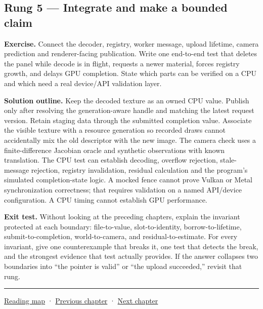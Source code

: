 \subsection{Rung 5 --- Integrate and make a bounded claim}\label{02-foundations-ii-ch038-rung-5-integrate-and-make-a-bounded-claim}

\textbf{Exercise.} Connect the decoder, registry, worker message, upload lifetime, camera prediction and renderer-facing publication. Write one end-to-end test that deletes the panel while decode is in flight, requests a newer material, forces registry growth, and delays GPU completion. State which parts can be verified on a CPU and which need a real device/API validation layer.

\textbf{Solution outline.} Keep the decoded texture as an owned CPU value. Publish only after resolving the generation-aware handle and matching the latest request version. Retain staging data through the submitted completion value. Associate the visible texture with a resource generation so recorded draws cannot accidentally mix the old descriptor with the new image. The camera check uses a finite-difference Jacobian oracle and synthetic observations with known translation. The CPU test can establish decoding, overflow rejection, stale-message rejection, registry invalidation, residual calculation and the program's simulated completion-state logic. A mocked fence cannot prove Vulkan or Metal synchronization correctness; that requires validation on a named API/device configuration. A CPU timing cannot establish GPU performance.

\textbf{Exit test.} Without looking at the preceding chapters, explain the invariant protected at each boundary: file-to-value, slot-to-identity, borrow-to-lifetime, submit-to-completion, world-to-camera, and residual-to-estimate. For every invariant, give one counterexample that breaks it, one test that detects the break, and the strongest evidence that test actually provides. If the answer collapses two boundaries into ``the pointer is valid'' or ``the upload succeeded,'' revisit that rung.

\begin{center}\rule{0.5\linewidth}{0.5pt}\end{center}

\hyperref[volume-reading-map]{Reading map} · \hyperref[02-foundations-ii-ch037-camera-contracts-and-transform-chain-debugging]{Previous chapter} · \hyperref[02-foundations-ii-ch039-research-navigation-and-source-boundaries]{Next chapter}
